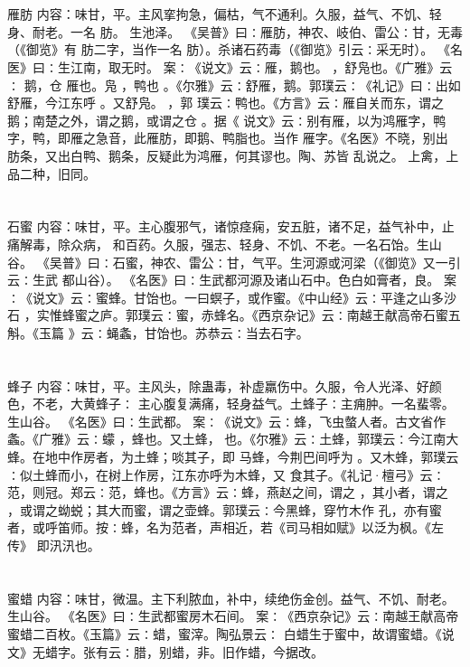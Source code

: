 \documentclass[12pt,UTF8]{ctexbook}
\begin{document}
\section{}雁肪
内容：味甘，平。主风挛拘急，偏枯，气不通利。久服，益气、不饥、轻身、耐老。一名 肪。 
生池泽。 
《吴普》曰∶雁肪，神农、岐伯、雷公∶甘，无毒（《御览》有 肪二字，当作一名 
肪）。杀诸石药毒（《御览》引云∶采无时）。 
《名医》曰∶生江南，取无时。 
案∶《说文》云∶雁，鹅也。 ，舒凫也。《广雅》云∶ 鹅，仓 雁也。凫 ，鸭也 
。《尔雅》云∶舒雁，鹅。郭璞云∶《礼记》曰∶出如舒雁，今江东呼 。又舒凫。 ，郭 
璞云∶鸭也。《方言》云∶雁自关而东，谓之 鹅；南楚之外，谓之鹅，或谓之仓 。据《 
说文》云∶别有雁，以为鸿雁字，鸭字，鸭，即雁之急音，此雁肪，即鹅、鸭脂也。当作 
雁字。《名医》不晓，别出 肪条，又出白鸭、鹅条，反疑此为鸿雁，何其谬也。陶、苏皆 
乱说之。 
上禽，上品二种，旧同。 


\section{}石蜜
内容：味甘，平。主心腹邪气，诸惊痉痫，安五脏，诸不足，益气补中，止痛解毒，除众病， 
和百药。久服，强志、轻身、不饥、不老。一名石饴。生山谷。 
《吴普》曰∶石蜜，神农、雷公∶甘，气平。生河源或河梁（《御览》又一引云∶生武 
都山谷）。 
《名医》曰∶生武都河源及诸山石中。色白如膏者，良。 
案∶《说文》云∶蜜蜂。甘饴也。一曰螟子，或作蜜。《中山经》云∶平逢之山多沙石 
，实惟蜂蜜之庐。郭璞云∶蜜，赤蜂名。《西京杂记》云∶南越王献高帝石蜜五斛。《玉篇 
》云∶蝇螽，甘饴也。苏恭云∶当去石字。 


\section{}蜂子
内容：味甘，平。主风头，除蛊毒，补虚羸伤中。久服，令人光泽、好颜色，不老，大黄蜂子∶ 
主心腹复满痛，轻身益气。土蜂子∶主痈肿。一名蜚零。生山谷。 
《名医》曰∶生武都。 
案∶《说文》云∶蜂，飞虫螫人者。古文省作螽。《广雅》云∶蠓 ，蜂也。又土蜂， 
也。《尔雅》云∶土蜂，郭璞云∶今江南大蜂。在地中作房者，为土蜂；啖其子，即 
马蜂，今荆巴间呼为 。又木蜂，郭璞云∶似土蜂而小，在树上作房，江东亦呼为木蜂，又 
食其子。《礼记·檀弓》云∶范，则冠。郑云∶范，蜂也。《方言》云∶蜂，燕赵之间，谓之 
，其小者，谓之 ，或谓之蚴蜕；其大而蜜，谓之壶蜂。郭璞云∶今黑蜂，穿竹木作 
孔，亦有蜜者，或呼笛师。按∶蜂，名为范者，声相近，若《司马相如赋》以泛为枫。《左 
传》 即汛汛也。 


\section{}蜜蜡
内容：味甘，微温。主下利脓血，补中，续绝伤金创。益气、不饥、耐老。生山谷。 
《名医》曰∶生武都蜜房木石间。 
案∶《西京杂记》云∶南越王献高帝蜜蜡二百枚。《玉篇》云∶蜡，蜜滓。陶弘景云∶ 
白蜡生于蜜中，故谓蜜蜡。《说文》无蜡字。张有云∶腊，别蜡，非。旧作蜡，今据改。 
\end{document}
